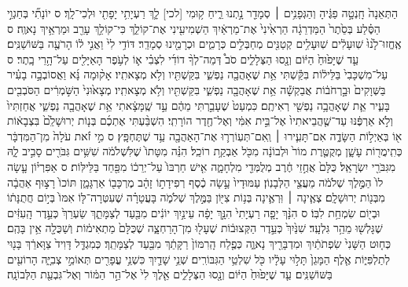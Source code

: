 \documentclass[11pt,twoside]{article}
\begin{document}
{הַתְּאֵנָה֙ חָֽנְטָ֣ה פַגֶּ֔יהָ וְהַגְּפָנִ֥ים ׀ סְמָדַ֖ר נָ֣תְנוּ רֵ֑יחַ ק֥וּמִי [לכי] לָ֛ךְ רַעְיָתִ֥י יָפָתִ֖י וּלְכִי־לָֽךְ׃ ס
יוֹנָתִ֞י בְּחַגְוֵ֣י הַסֶּ֗לַע בְּסֵ֙תֶר֙ הַמַּדְרֵגָ֔ה הַרְאִ֙ינִי֙ אֶת־מַרְאַ֔יִךְ הַשְׁמִיעִ֖ינִי אֶת־קוֹלֵ֑ךְ כִּי־קוֹלֵ֥ךְ עָרֵ֖ב וּמַרְאֵ֥יךְ נָאוֶֽה׃ ס
אֶֽחֱזוּ־לָ֙נוּ֙ שֽׁוּעָלִ֔ים שֽׁוּעָלִ֥ים קְטַנִּ֖ים מְחַבְּלִ֣ים כְּרָמִ֑ים וּכְרָמֵ֖ינוּ סְמָדַֽר׃
דּוֹדִ֥י לִי֙ וַאֲנִ֣י ל֔וֹ הָרֹעֶ֖ה בַּשּׁוֹשַׁנִּֽים׃
עַ֤ד שֶׁיָּפ֙וּחַ֙ הַיּ֔וֹם וְנָ֖סוּ הַצְּלָלִ֑ים סֹב֩ דְּמֵה־לְךָ֨ דוֹדִ֜י לִצְבִ֗י א֛וֹ לְעֹ֥פֶר הָאַיָּלִ֖ים עַל־הָ֥רֵי בָֽתֶר׃ ס
עַל־מִשְׁכָּבִי֙ בַּלֵּיל֔וֹת בִּקַּ֕שְׁתִּי אֵ֥ת שֶׁאָהֲבָ֖ה נַפְשִׁ֑י בִּקַּשְׁתִּ֖יו וְלֹ֥א מְצָאתִֽיו׃
אָק֨וּמָה נָּ֜א וַאֲסוֹבְבָ֣ה בָעִ֗יר בַּשְּׁוָקִים֙ וּבָ֣רְחֹב֔וֹת אֲבַקְשָׁ֕ה אֵ֥ת שֶׁאָהֲבָ֖ה נַפְשִׁ֑י בִּקַּשְׁתִּ֖יו וְלֹ֥א מְצָאתִֽיו׃
מְצָא֙וּנִי֙ הַשֹּׁ֣מְרִ֔ים הַסֹּבְבִ֖ים בָּעִ֑יר אֵ֛ת שֶׁאָהֲבָ֥ה נַפְשִׁ֖י רְאִיתֶֽם׃
כִּמְעַט֙ שֶׁעָבַ֣רְתִּי מֵהֶ֔ם עַ֣ד שֶֽׁמָּצָ֔אתִי אֵ֥ת שֶׁאָהֲבָ֖ה נַפְשִׁ֑י אֲחַזְתִּיו֙ וְלֹ֣א אַרְפֶּ֔נּוּ עַד־שֶׁ֤הֲבֵיאתִיו֙ אֶל־בֵּ֣ית אִמִּ֔י וְאֶל־חֶ֖דֶר הוֹרָתִֽי׃
הִשְׁבַּ֨עְתִּי אֶתְכֶ֜ם בְּנ֤וֹת יְרוּשָׁלִַ֙ם֙ בִּצְבָא֔וֹת א֖וֹ בְּאַיְל֣וֹת הַשָּׂדֶ֑ה אִם־תָּעִ֧ירוּ ׀ וְֽאִם־תְּעֽוֹרְר֛וּ אֶת־הָאַהֲבָ֖ה עַ֥ד שֶׁתֶּחְפָּֽץ׃ ס
מִ֣י זֹ֗את עֹלָה֙ מִן־הַמִּדְבָּ֔ר כְּתִֽימֲר֖וֹת עָשָׁ֑ן מְקֻטֶּ֤רֶת מוֹר֙ וּלְבוֹנָ֔ה מִכֹּ֖ל אַבְקַ֥ת רוֹכֵֽל׃
הִנֵּ֗ה מִטָּתוֹ֙ שֶׁלִּשְׁלֹמֹ֔ה שִׁשִּׁ֥ים גִּבֹּרִ֖ים סָבִ֣יב לָ֑הּ מִגִּבֹּרֵ֖י יִשְׂרָאֵֽל׃
כֻּלָּם֙ אֲחֻ֣זֵי חֶ֔רֶב מְלֻמְּדֵ֖י מִלְחָמָ֑ה אִ֤ישׁ חַרְבּוֹ֙ עַל־יְרֵכ֔וֹ מִפַּ֖חַד בַּלֵּילּֽוֹת׃ ס
אַפִּרְי֗וֹן עָ֤שָׂה לוֹ֙ הַמֶּ֣לֶךְ שְׁלֹמֹ֔ה מֵעֲצֵ֖י הַלְּבָנֽוֹן׃
עַמּוּדָיו֙ עָ֣שָׂה כֶ֔סֶף רְפִידָת֣וֹ זָהָ֔ב מֶרְכָּב֖וֹ אַרְגָּמָ֑ן תּוֹכוֹ֙ רָצ֣וּף אַהֲבָ֔ה מִבְּנ֖וֹת יְרוּשָׁלָֽ͏ִם׃
צְאֶ֧ינָה ׀ וּֽרְאֶ֛ינָה בְּנ֥וֹת צִיּ֖וֹן בַּמֶּ֣לֶךְ שְׁלֹמֹ֑ה בָּעֲטָרָ֗ה שֶׁעִטְּרָה־לּ֤וֹ אִמּוֹ֙ בְּי֣וֹם חֲתֻנָּת֔וֹ וּבְי֖וֹם שִׂמְחַ֥ת לִבּֽוֹ׃ ס
הִנָּ֨ךְ יָפָ֤ה רַעְיָתִי֙ הִנָּ֣ךְ יָפָ֔ה עֵינַ֣יִךְ יוֹנִ֔ים מִבַּ֖עַד לְצַמָּתֵ֑ךְ שַׂעְרֵךְ֙ כְּעֵ֣דֶר הָֽעִזִּ֔ים שֶׁגָּלְשׁ֖וּ מֵהַ֥ר גִּלְעָֽד׃
שִׁנַּ֙יִךְ֙ כְּעֵ֣דֶר הַקְּצוּב֔וֹת שֶׁעָל֖וּ מִן־הָרַחְצָ֑ה שֶׁכֻּלָּם֙ מַתְאִימ֔וֹת וְשַׁכֻּלָ֖ה אֵ֥ין בָּהֶֽם׃
כְּח֤וּט הַשָּׁנִי֙ שִׂפְתֹתַ֔יִךְ וּמִדְבָּרֵ֖יךְ נָאוֶ֑ה כְּפֶ֤לַח הָֽרִמּוֹן֙ רַקָּתֵ֔ךְ מִבַּ֖עַד לְצַמָּתֵֽךְ׃
כְּמִגְדַּ֤ל דָּוִיד֙ צַוָּארֵ֔ךְ בָּנ֖וּי לְתַלְפִּיּ֑וֹת אֶ֤לֶף הַמָּגֵן֙ תָּל֣וּי עָלָ֔יו כֹּ֖ל שִׁלְטֵ֥י הַגִּבּוֹרִֽים׃
שְׁנֵ֥י שָׁדַ֛יִךְ כִּשְׁנֵ֥י עֳפָרִ֖ים תְּאוֹמֵ֣י צְבִיָּ֑ה הָרוֹעִ֖ים בַּשּׁוֹשַׁנִּֽים׃
עַ֤ד שֶׁיָּפ֙וּחַ֙ הַיּ֔וֹם וְנָ֖סוּ הַצְּלָלִ֑ים אֵ֤לֶךְ לִי֙ אֶל־הַ֣ר הַמּ֔וֹר וְאֶל־גִּבְעַ֖ת הַלְּבוֹנָֽה׃
}
\end{document}

